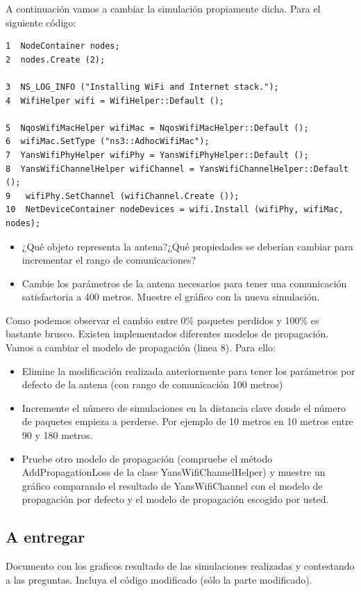 A continuación vamos a cambiar la simulación propiamente dicha. Para el siguiente código:
\begin{verbatim}
1  NodeContainer nodes;
2  nodes.Create (2);

3  NS_LOG_INFO ("Installing WiFi and Internet stack.");
4  WifiHelper wifi = WifiHelper::Default ();

5  NqosWifiMacHelper wifiMac = NqosWifiMacHelper::Default ();
6  wifiMac.SetType ("ns3::AdhocWifiMac");
7  YansWifiPhyHelper wifiPhy = YansWifiPhyHelper::Default ();
8  YansWifiChannelHelper wifiChannel = YansWifiChannelHelper::Default ();
9   wifiPhy.SetChannel (wifiChannel.Create ());
10  NetDeviceContainer nodeDevices = wifi.Install (wifiPhy, wifiMac, nodes);
\end{verbatim}

\begin{itemize}
	\item ¿Qué objeto representa la antena?¿Qué propiedades se deberían cambiar para incrementar el rango de comunicaciones?
	\item Cambie los parámetros de la antena necesarios para tener una comunicación satisfactoria a 400 metros. Muestre el gráfico con la nueva simulación.
\end{itemize}

Como podemos observar el cambio entre 0\% paquetes perdidos y 100\% es bastante brusco. Existen implementados diferentes modelos de propagación. Vamos 
a cambiar el modelo de propagación (linea 8). Para ello:
\begin{itemize}
	\item Elimine la modificación realizada anteriormente para tener los parámetros por defecto de la antena (con rango de comunicación 100 metros)
	\item Incremente el número de simulaciones en la distancia clave donde el número de paquetes empieza a perderse. Por ejemplo de 10 metros en 10 metros entre 90 y 180 metros.
	\item Pruebe otro modelo de propagación (compruebe el método AddPropagationLoss de la clase YansWifiChannelHelper) y muestre un gráfico comparando el resultado de YansWifiChannel con el modelo de propagación por defecto y el modelo de propagación escogido por usted.  
\end{itemize}

\subsection{A entregar}
Documento con los graficos resultado de las simulaciones realizadas y contestando a las preguntas. Incluya el código modificado (sólo la parte modificado).

